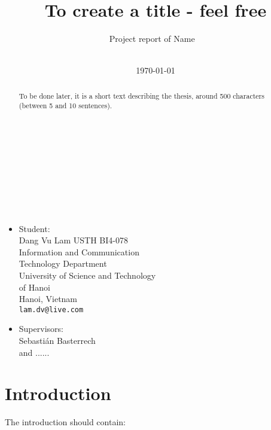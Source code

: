 \documentclass[11pt]{article}
\title{To create a title - feel free}
\author{
Project report of Name
~\\
\\
}
\date{\today}
\begin{document}
\maketitle

~\\
~\\
~\\
~\\
~\\
~\\

\begin{minipage}[t]{0.5\textwidth}
\begin{itemize}
\item Student:\\ 
Dang Vu Lam	USTH BI4-078\\
Information and Communication \\Technology Department\\
University of Science and Technology \\of Hanoi\\
Hanoi, Vietnam\\
\texttt{lam.dv@live.com}
\end{itemize}
\end{minipage}
\begin{minipage}[t]{0.5\textwidth}
\begin{itemize}
\item Supervisors:\\
Sebasti\'an Basterrech\\
and
......
\end{itemize}
\end{minipage}

\clearpage
\newpage

\begin{abstract}

To be done later, it is a short text describing the thesis, around 500 characters (between 5 and 10 sentences).

%
\end{abstract}
\newpage
\tableofcontents
\newpage
\section{Introduction}
The introduction should contain:
\end{document}
